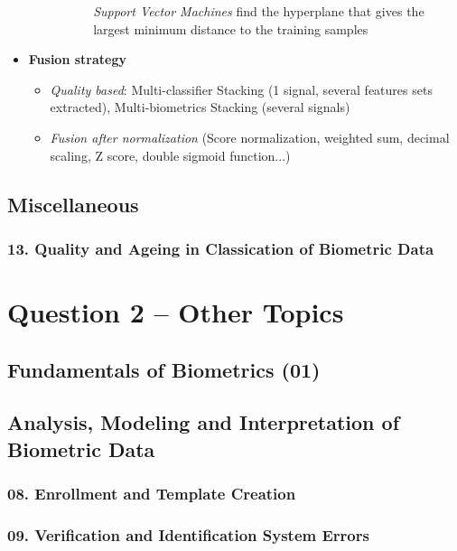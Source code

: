 \documentclass[a4paper]{article}
\begin{document}
\begin{itemize}
\begin{itemize}
\begin{itemize}
\begin{itemize}
                \emph{Support Vector Machines} find the hyperplane that gives the largest minimum distance to the training samples
              \end{itemize}
            \end{itemize}
          \end{itemize}
          \item \textbf{Fusion strategy}
          \begin{itemize}
            \item \emph{Quality based}: Multi-classifier Stacking (1 signal, several features sets extracted), Multi-biometrics Stacking (several signals)
            \item \emph{Fusion after normalization} (Score normalization, weighted sum, decimal scaling, Z score, double sigmoid function...)
          \end{itemize}
        \end{itemize}
  \subsection*{Miscellaneous}
    \subsubsection*{13. Quality and Ageing in Classication of Biometric Data}

\newpage

\section*{Question 2 -- Other Topics} %
\label{sec:question_2_other_topics}
  \subsection*{Fundamentals of Biometrics (01)}
    
  \subsection*{Analysis, Modeling and Interpretation of Biometric Data}
    
    \subsubsection*{08. Enrollment and Template Creation}
    \subsubsection*{09. Verification and Identification System Errors}
      \newpage
\end{document}
